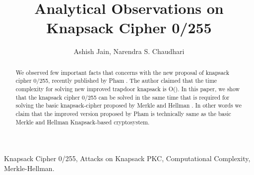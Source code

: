 \documentclass[5p,times,twocolumn]{elsarticle}
\begin{document}
\begin{frontmatter}



\title{Analytical Observations on Knapsack Cipher 0/255}
\author{Ashish Jain, Narendra S. Chaudhari}
\address{Department of Computer Science and Engineering, Indian Institute of Technology Indore, India}


\begin{abstract}
We observed few important facts that concerns with the new proposal of knapsack cipher 0/255, recently published by Pham \cite{pham2011improvement}. The author claimed that the time complexity for solving new improved trapdoor knapsack is O(). In this paper, we show that the knapsack cipher 0/255 can be solved in the same time that is required  for solving the basic knapsack-cipher proposed by Merkle and Hellman \cite{merkle1978hiding}. In other words we claim that the improved version proposed by Pham \cite{pham2011improvement} is technically same as the basic Merkle and Hellman Knapsack-based cryptosystem.
\end{abstract}

\begin{keyword}
\label{abstract}
Knapsack Cipher 0/255, Attacks on Knapsack PKC, Computational Complexity, Merkle-Hellman.
\end{keyword}

\end{frontmatter}
\end{document}
